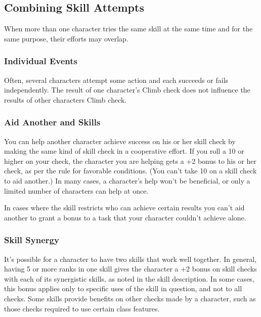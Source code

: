 \subsection{Combining Skill Attempts}

When more than one character tries the same skill at the same time and for the 
same purpose, their efforts may overlap.

\subsubsection{Individual Events}

Often, several characters attempt some action and each succeeds or fails independently. 
 The result of one character's Climb check does not influence the results of other 
characters Climb check.

\subsubsection{Aid Another and Skills}

You can help another character achieve success on his or her skill check by making 
the same kind of skill check in a cooperative effort. If you roll a 10 or higher 
on your check, the character you are helping gets a +2 bonus to his or her check, 
as per the rule for favorable conditions. (You can't take 10 on a skill check to 
aid another.) In many cases, a character's help won't be beneficial, or only a 
limited number of characters can help at once. 

In cases where the skill restricts who can achieve certain results you can't aid 
another to grant a bonus to a task that your character couldn't achieve alone.

\subsubsection{Skill Synergy}

It's possible for a character to have two skills that work well together. In general, 
having 5 or more ranks in one skill gives the character a +2 bonus on skill checks 
with each of its synergistic skills, as noted in the skill description. In some 
cases, this bonus applies only to specific uses of the skill in question, and not 
to all checks. Some skills provide benefits on other checks made by a character, 
such as those checks required to use certain class features.

